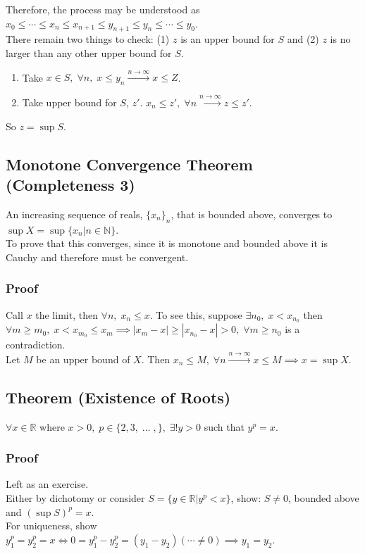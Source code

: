 \documentclass[11pt]{article}
\newcommand{\0}{\emptyset}
\newcommand{\N}{\mathbb{N}}
\newcommand{\R}{\mathbb{R}}
\begin{document}
Therefore, the process may be understood as \(x_{0}\leq\cdots\leq x_{n}\leq x_{n+1}\leq y_{n+1}\leq y_{n}\leq\cdots\leq y_{0}\).\\[0pt]
There remain two things to check: (1) \(z\) is an upper bound for \(S\) and (2) \(z\) is no larger than any other upper bound for \(S\).\\[0pt]
\begin{enumerate}
\item Take \(x\in S,\;\forall n,\;x\leq y_{n}\overset{n\to\infty}{\longrightarrow}x\leq Z\).\\[0pt]
\item Take upper bound for \(S\), \(z'\). \(x_{n}\leq z',\;\forall n\overset{n\to\infty}{\longrightarrow}z\leq z'\).\\[0pt]
\end{enumerate}
So \(z=\sup{S}\).\\[0pt]
\subsection*{Monotone Convergence Theorem (Completeness 3)}
\label{sec:orgee99e53}
An increasing sequence of reals, \(\{x_{n}\}_{n}\), that is bounded above, converges to \(\sup{X}=\sup\{x_{n}|n\in\N\}\).\\[0pt]
To prove that this converges, since it is monotone and bounded above it is Cauchy and therefore must be convergent.\\[0pt]
\subsubsection*{Proof}
\label{sec:org0684715}
Call \(x\) the limit, then \(\forall n,\;x_{n}\leq x\). To see this, suppose \(\exists n_{0},\;x<x_{n_{0}}\) then \(\forall m\geq m_{0},\;x<x_{m_{0}}\leq x_{m} \implies |x_{m}-x|\geq|x_{n_{0}}-x|>0,\;\forall m\geq n_{0}\) is a contradiction.\\[0pt]
Let \(M\) be an upper bound of \(X\). Then \(x_{n}\leq M,\;\forall n\overset{n\to\infty}{\longrightarrow}x\leq M\implies x=\sup{X}\).\\[0pt]
\subsection*{Theorem (Existence of Roots)}
\label{sec:org5391460}
\(\forall x\in\R\) where \(x>0,\;p\in\{2,3,\;\ldots\;,\},\;\exists!y>0\) such that \(y^{p}=x\).\\[0pt]
\subsubsection*{Proof}
\label{sec:org44f4ca7}
Left as an exercise.\\[0pt]
Either by dichotomy or consider \(S=\{y\in\R|y^{p}<x\}\), show: \(S\neq 0\), bounded above and \((\sup{S})^{p}=x\).\\[0pt]
For uniqueness, show \(y_{1}^{p}=y_{2}^{p}=x \iff 0=y_{1}^{p}-y_{2}^{p}=(y_{1}-y_{2})(\cdots\neq 0)\implies y_{1}=y_{2}\).\\[0pt]
\end{document}
